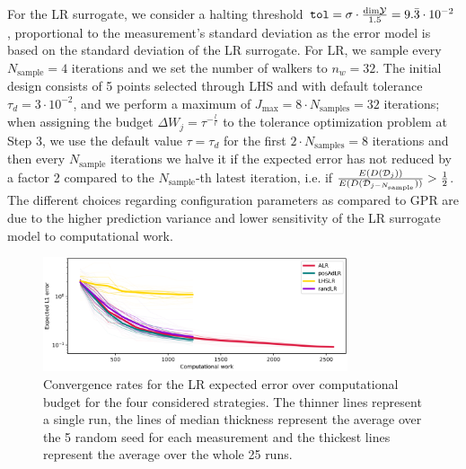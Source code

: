 For the LR surrogate, we consider a halting threshold $\texttt{tol} = \sigma \cdot \frac{\text{dim} \mathcal Y }{1.5} = 9.\bar 3 \cdot 10^{-2}$, proportional to the measurement's standard deviation as the error model is based on the standard deviation of the LR surrogate.
For LR, we sample every $N_{\text{sample}} = 4$ iterations and we set the number of walkers to $n_w = 32$.
The initial design consists of 5 points selected through LHS and with default tolerance $\tau_d = 3 \cdot 10^{-2}$, and we perform a maximum of $J_{\max} = 8 \cdot N_{\text{samples}} = 32$ iterations; when assigning the budget $\Delta W_j = \tau ^{-\frac{l}{r}}$ to the tolerance optimization problem at Step 3, we use the default value $\tau= \tau_d$ for the first $2\cdot N_{\text{samples}}= 8$ iterations and then every $N_{\text{sample}}$ iterations we halve it if the expected error has not reduced by a factor 2 compared to the $N_{\text{sample}}$-th latest iteration, i.e. if $\frac{E(D(\mathcal D_j))}{E(D(\mathcal D_{j-N_{\text{sample}}}))} > \frac{1}{2}$.
The different choices regarding configuration parameters as compared to GPR are due to the higher prediction variance and lower sensitivity of the LR surrogate model to computational work. 

\begin{figure}[H]
\begin{center}
    \includegraphics[width=0.8\textwidth]{results/pictures/d3/LR_res.png}
\end{center}
\caption{Convergence rates for the LR expected error over computational budget for the four considered strategies. The thinner lines represent a single run, the lines of median thickness represent the average over the 5 random seed for each measurement and the thickest lines represent the average over the whole 25 runs.}
\label{fig:3dLRconv}
\end{figure}

